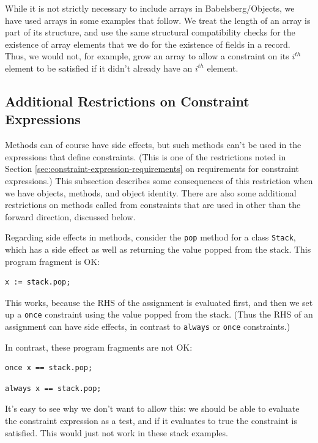 \documentclass{article}
\newcounter{examples}
\begin{document}
While it is not strictly necessary to include arrays in
Babelsberg/Objects, we have used arrays in some examples that follow.
We treat the length of an array is part of its structure, and use the
same structural compatibility checks for the existence of array
elements that we do for the existence of fields in a record.  Thus, we
would not, for example, grow an array to allow a constraint on its
$i^{th}$ element to be satisfied if it didn't already have an $i^{th}$
element.

\subsection{Additional Restrictions on Constraint Expressions}
\label{sec:additional-constraint-restrictions}

Methods can of course have side effects, but 
such methods can't be used in the expressions that define
constraints.  (This is one of the restrictions noted in Section
\ref{sec:constraint-expression-requirements} on requirements for
constraint expressions.)  This subsection describes some consequences
of this restriction when we have objects, methods, and object
identity.  There are also some additional restrictions on methods
called from constraints that are used in other than the forward
direction, discussed below.

Regarding side effects in methods, consider the \verb|pop| method for
a class \verb|Stack|, which has a side effect as well as returning the
value popped from the stack.  This program fragment is OK:

\begin{verbatim}
x := stack.pop;
\end{verbatim}

This works, because the RHS of the assignment is evaluated first, and
then we set up a \verb|once| constraint using the value popped from the
stack.  (Thus the RHS of an assignment can have side effects, in contrast
to \verb|always| or \verb|once| constraints.)

In contrast, these program fragments are not OK:
\begin{verbatim}
once x == stack.pop;
\end{verbatim}

\begin{verbatim}
always x == stack.pop;
\end{verbatim}

It's easy to see why we don't want to allow this: we should be able to
evaluate the constraint expression as a test, and if it evaluates to
true the constraint is satisfied.  This would just not work in these
stack examples.
\end{document}
